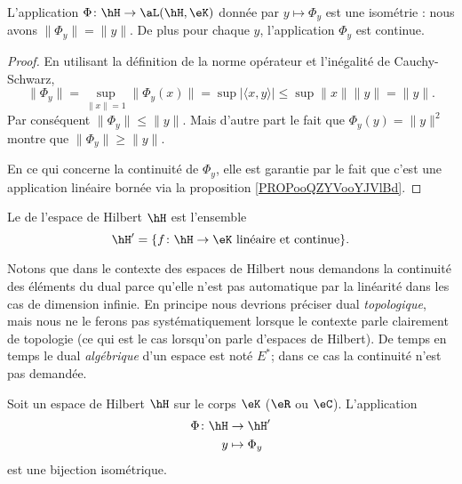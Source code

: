 \begin{lemma}       \label{LemjYVcHE}
    L'application  \( \Phi\colon \hH\to \aL(\hH,\eK)\) donnée par \( y\mapsto\Phi_y\) est une isométrie : nous avons \( \| \Phi_y \|=\| y \|\). De plus pour chaque \( y\), l'application \( \Phi_y\) est continue.
\end{lemma}

\begin{proof}
    En utilisant la définition de la norme opérateur et l'inégalité de Cauchy-Schwarz,
    \begin{equation}
        \| \Phi_y \|=\sup_{\| x \| =1}\| \Phi_y(x) \|=\sup| \langle x, y\rangle  |\leq\sup\| x \|\| y \|=\| y \|.
    \end{equation}
    Par conséquent \( \| \Phi_y \|\leq\| y \|\). Mais d'autre part le fait que \( \Phi_y(y)=\| y \|^2\) montre que \( \| \Phi_y \|\geq \| y \|\).

    En ce qui concerne la continuité de \( \Phi_y\), elle est garantie par le fait que c'est une application linéaire bornée via la proposition \ref{PROPooQZYVooYJVlBd}.
\end{proof}

\begin{definition}
    Le  de l'espace de Hilbert \( \hH\) est l'ensemble
    \begin{equation}
        \hH'=\{ f\colon \hH\to \eK\text{ linéaire et continue} \}.
    \end{equation}
\end{definition}
Notons que dans le contexte des espaces de Hilbert nous demandons la continuité des éléments du dual parce qu'elle n'est pas automatique par la linéarité dans les cas de dimension infinie. En principe nous devrions préciser dual \emph{topologique}, mais nous ne le ferons pas systématiquement lorsque le contexte parle clairement de topologie (ce qui est le cas lorsqu'on parle d'espaces de Hilbert). De temps en temps le dual \emph{algébrique} d'un espace est noté \( E^*\); dans ce cas la continuité n'est pas demandée.

\begin{theorem}        \label{ThoQgTovL}
    Soit un espace de Hilbert \( \hH\) sur le corps \( \eK\) (\( \eR\) ou \( \eC\)). L'application
    \begin{equation}
        \begin{aligned}
            \Phi\colon \hH&\to \hH' \\
            y&\mapsto \Phi_y 
        \end{aligned}
    \end{equation}
    est une bijection isométrique.
\end{theorem}

